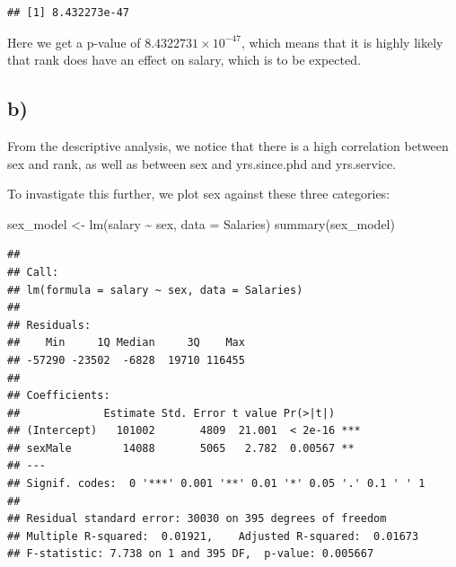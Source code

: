 \documentclass[
]{article}
\newenvironment{Shaded}{\begin{snugshade}}{\end{snugshade}}
\newcommand{\AttributeTok}[1]{\textcolor[rgb]{0.77,0.63,0.00}{#1}}
\newcommand{\FunctionTok}[1]{\textcolor[rgb]{0.00,0.00,0.00}{#1}}
\newcommand{\NormalTok}[1]{#1}
\newcommand{\OtherTok}[1]{\textcolor[rgb]{0.56,0.35,0.01}{#1}}
\newcommand{\SpecialCharTok}[1]{\textcolor[rgb]{0.00,0.00,0.00}{#1}}
\newcommand{\StringTok}[1]{\textcolor[rgb]{0.31,0.60,0.02}{#1}}
\begin{document}
\begin{Shaded}
\end{Shaded}

\begin{verbatim}
## [1] 8.432273e-47
\end{verbatim}

Here we get a p-value of \ensuremath{8.4322731\times 10^{-47}}, which
means that it is highly likely that rank does have an effect on salary,
which is to be expected.

\hypertarget{b-1}{%
\subsection{b)}\label{b-1}}

From the descriptive analysis, we notice that there is a high
correlation between sex and rank, as well as between sex and
yrs.since.phd and yrs.service.

To invastigate this further, we plot sex against these three categories:

\begin{Shaded}
\begin{Highlighting}[]
\NormalTok{sex\_model }\OtherTok{\textless{}{-}} \FunctionTok{lm}\NormalTok{(salary }\SpecialCharTok{\textasciitilde{}}\NormalTok{ sex, }\AttributeTok{data =}\NormalTok{ Salaries)}
\FunctionTok{summary}\NormalTok{(sex\_model)}
\end{Highlighting}
\end{Shaded}

\begin{verbatim}
## 
## Call:
## lm(formula = salary ~ sex, data = Salaries)
## 
## Residuals:
##    Min     1Q Median     3Q    Max 
## -57290 -23502  -6828  19710 116455 
## 
## Coefficients:
##             Estimate Std. Error t value Pr(>|t|)    
## (Intercept)   101002       4809  21.001  < 2e-16 ***
## sexMale        14088       5065   2.782  0.00567 ** 
## ---
## Signif. codes:  0 '***' 0.001 '**' 0.01 '*' 0.05 '.' 0.1 ' ' 1
## 
## Residual standard error: 30030 on 395 degrees of freedom
## Multiple R-squared:  0.01921,    Adjusted R-squared:  0.01673 
## F-statistic: 7.738 on 1 and 395 DF,  p-value: 0.005667
\end{verbatim}
\end{document}
